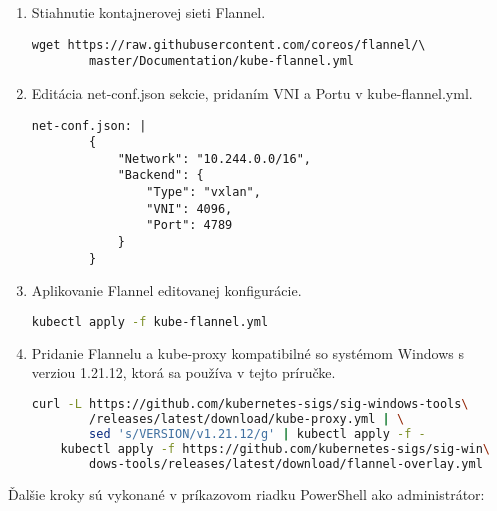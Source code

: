\begin{enumerate}
\item{\noindent Stiahnutie kontajnerovej sieti Flannel.
\begin{lstlisting}[basicstyle=\footnotesize]
    wget https://raw.githubusercontent.com/coreos/flannel/\
        master/Documentation/kube-flannel.yml
    \end{lstlisting}}
\item{\noindent Editácia net-conf.json sekcie, pridaním VNI a Portu v kube-flannel.yml.
\begin{lstlisting}[basicstyle=\footnotesize]
    net-conf.json: |
        {
            "Network": "10.244.0.0/16",
            "Backend": {
                "Type": "vxlan",
                "VNI": 4096,
                "Port": 4789
            }
        }
    \end{lstlisting}}
\item{\noindent Aplikovanie Flannel editovanej konfigurácie.
\begin{lstlisting}[language=Bash,basicstyle=\footnotesize]
    kubectl apply -f kube-flannel.yml
    \end{lstlisting}}
\item{\noindent Pridanie Flannelu a kube-proxy kompatibilné so systémom Windows s verziou 1.21.12, ktorá sa používa v tejto príručke.
\begin{lstlisting}[language=Bash,basicstyle=\footnotesize]
    curl -L https://github.com/kubernetes-sigs/sig-windows-tools\
        /releases/latest/download/kube-proxy.yml | \
        sed 's/VERSION/v1.21.12/g' | kubectl apply -f -
    kubectl apply -f https://github.com/kubernetes-sigs/sig-win\
        dows-tools/releases/latest/download/flannel-overlay.yml
    \end{lstlisting}}
\end{enumerate}

\noindent Ďalšie kroky sú vykonané v príkazovom riadku PowerShell ako administrátor:

